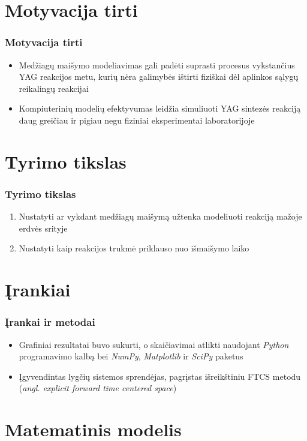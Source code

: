 \documentclass{beamer}
\begin{document}
\section{Motyvacija tirti}

\begin{frame}
\frametitle{Motyvacija tirti}
  \begin{itemize}
    \item Medžiagų maišymo modeliavimas gali padėti suprasti procesus vykstančius YAG reakcijos metu, kurių nėra galimybės ištirti fiziškai dėl aplinkos sąlygų reikalingų reakcijai
    \item Kompiuterinių modelių efektyvumas leidžia simuliuoti YAG sintezės reakciją daug greičiau ir pigiau negu fiziniai eksperimentai laboratorijoje
  \end{itemize}
\end{frame}

\section{Tyrimo tikslas}
\begin{frame}
  \frametitle{Tyrimo tikslas}
  \begin{enumerate}
    \item Nustatyti ar vykdant medžiagų maišymą užtenka modeliuoti reakciją mažoje erdvės srityje
    \item Nustatyti kaip reakcijos trukmė priklauso nuo išmaišymo laiko
  \end{enumerate}
\end{frame}

\section{Įrankiai}

\begin{frame}
  \frametitle{Įrankai ir metodai}
  \begin{itemize}
    \item Grafiniai rezultatai buvo sukurti, o skaičiavimai atlikti naudojant \textit{Python} programavimo kalbą bei \textit{NumPy}, \textit{Matplotlib} ir \textit{SciPy} paketus
    \item Įgyvendintas lygčių sistemos sprendėjas, pagrįstas išreikštiniu FTCS metodu (\textit{angl. explicit forward time centered space})
  \end{itemize}
\end{frame}

\section{Matematinis modelis}
\end{document}
